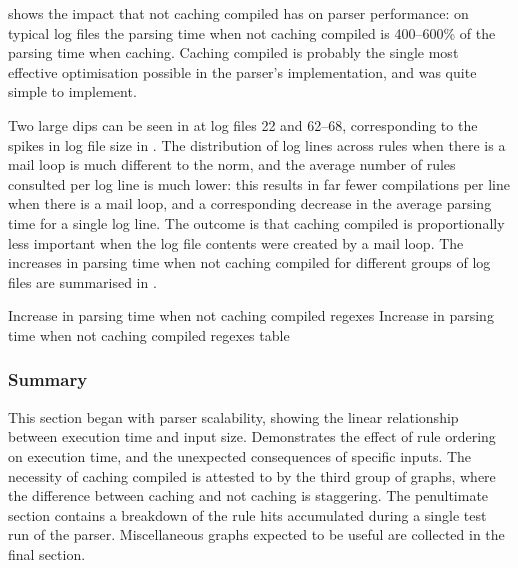 shows the impact that not caching compiled \regexes{} has on parser
performance: on typical log files the parsing time when not caching
compiled \regexes{} is 400--600\% of the parsing time when caching.
Caching compiled \regexes{} is probably the single most effective
optimisation possible in the parser's implementation, and was quite simple
to implement.


Two large dips can be seen in  at log files 22 and 62--68, corresponding
to the spikes in log file size in .  The distribution of log lines across rules when
there is a mail loop is much different to the norm, and the average number
of rules consulted per log line is much lower: this results in far fewer
\regex{} compilations per line when there is a mail loop, and a
corresponding decrease in the average parsing time for a single log line.
The outcome is that caching compiled \regexes{} is proportionally less
important when the log file contents were created by a mail loop.  The
increases in parsing time when not caching compiled \regexes{} for
different groups of log files are summarised in .

 {Increase in
parsing time when not caching compiled regexes} {Increase in parsing time
when not caching compiled regexes table}


\subsubsection{Summary}

This section began with parser scalability, showing the linear relationship
between execution time and input size.  Demonstrates the effect of rule
ordering on execution time, and the unexpected consequences of specific
inputs.  The necessity of caching compiled \regexes{} is attested to by the
third group of graphs, where the difference between caching and not caching
is staggering.  The penultimate section contains a breakdown of the rule
hits accumulated during a single test run of the parser.  Miscellaneous
graphs expected to be useful are collected in the final section.  

